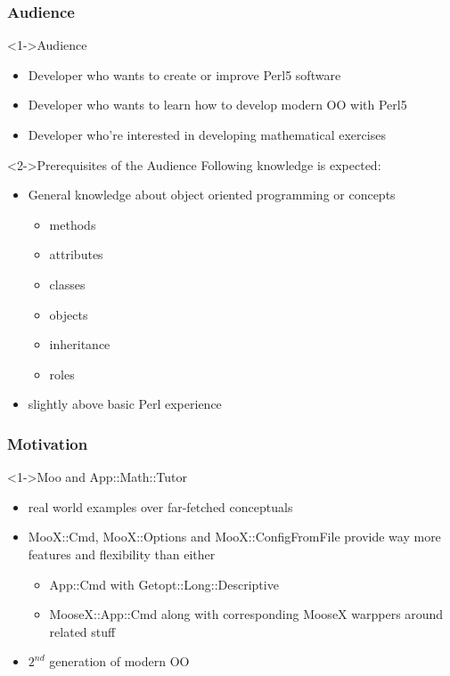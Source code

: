 \documentclass[ngerman,xcolor={table,dvipsnames},smaller,compress,hyperref={bookmarks,colorlinks}]{beamer}
\begin{document}
\begin{frame}[fragile]
\frametitle{Audience}
\begin{block}<1->{Audience}
\begin{itemize}
\item Developer who wants to create or improve Perl5 software
\item Developer who wants to learn how to develop modern OO with Perl5
\item Developer who're interested in developing mathematical exercises
\end{itemize}
\end{block}

\begin{block}<2->{Prerequisites of the Audience}
Following knowledge is expected:
\begin{itemize}
\item General knowledge about object oriented programming or concepts
      \begin{itemize}
      \item methods
      \item attributes
      \item classes
      \item objects
      \item inheritance
      \item roles
      \end{itemize}
\item slightly above basic Perl experience
\end{itemize}
\end{block}
\end{frame}

\begin{frame}[fragile]
\frametitle{Motivation}

\begin{block}<1->{Moo and App::Math::Tutor}
\begin{itemize}
\item real world examples over far-fetched conceptuals
\item MooX::Cmd, MooX::Options and MooX::ConfigFromFile provide way more features and flexibility than either
      \begin{itemize}
      \item App::Cmd with Getopt::Long::Descriptive
      \item MooseX::App::Cmd along with corresponding MooseX warppers around related stuff
      \end{itemize}
\item $ 2^{nd} $ generation of modern OO
\end{itemize}
\end{block}

\end{frame}
\end{document}
